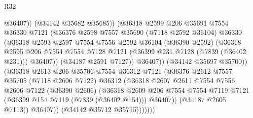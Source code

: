 \begin{lexlean}{R32}
\begin{coremodule}
                                @36407))
                            (@34142 @35682 @35685))
                          (@36318
                            @2599
                            @206
                            @35691
                            @7554
                            @36330
                            @7121
                            (@36376
                              @2598
                              @7557
                              @35690
                              (@7118 @2592 @36104)
                              @36330
                              (@36318
                                @2593
                                @2597
                                @7554
                                @7556
                                @2592
                                @36104
                                (@36390 @2592)
                                (@36318
                                  @2595
                                  @206
                                  @7554
                                  @7554
                                  @7128
                                  @7121
                                  (@36399 @231 @7128 (@7839 (@36402 @231)))
                                  @36407))
                              (@34187 @2591 @7127))
                            @36407))
                        (@34142 @35697 @35700))
                      (@36318
                        @2613
                        @206
                        @35706
                        @7554
                        @36312
                        @7121
                        (@36376
                          @2612
                          @7557
                          @35705
                          (@7118 @2606 @7122)
                          @36312
                          (@36318
                            @2607
                            @2611
                            @7554
                            @7556
                            @2606
                            @7122
                            (@36390 @2606)
                            (@36318
                              @2609
                              @206
                              @7554
                              @7554
                              @7119
                              @7121
                              (@36399 @154 @7119 (@7839 (@36402 @154)))
                              @36407))
                          (@34187 @2605 @7113))
                        @36407))
                    (@34142 @35712 @35715)))))))

\end{coremodule}
\end{lexlean}
